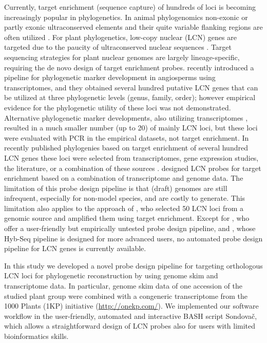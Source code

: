 \documentclass[a4paper, 11pt, twoside]{article}
\begin{document}
Currently, target enrichment (sequence capture) of hundreds of loci is becoming increasingly popular in phylogenetics. In animal phylogenomics non-exonic or partly exonic ultraconserved elements and their quite variable flanking regions are often utilized \citep[e.g.][]{Faircloth2012, Hedtke2013, Smith2014}. For plant phylogenetics, low-copy nuclear (LCN) genes are targeted \citep{Mandel2014, Weitemier2014, Grover2015, Heyduk2015, Mandel2015, Nicholls2015, Stephens2015a, Stephens2015} due to the paucity of ultraconserved nuclear sequences \citep{Reneker2012}. Target sequencing strategies for plant nuclear genomes are largely lineage-specific, requiring the de novo design of target enrichment probes. \citet{Chamala2015a} recently introduced a pipeline for phylogenetic marker development in angiosperms using transcriptomes, and they obtained several hundred putative LCN genes that can be utilized at three phylogenetic levels (genus, family, order); however empirical evidence for the phylogenetic utility of these loci was not demonstrated. Alternative phylogenetic marker developments, also utilizing transcriptomes \citep{Pillon2014, Rothfels2013, Tonnabel2014}, resulted in a much smaller number (up to 20) of mainly LCN loci, but these loci were evaluated with PCR in the empirical datasets, not target enrichment. In recently published phylogenies based on target enrichment of several hundred LCN genes these loci were selected from transcriptomes, gene expression studies, the literature, or a combination of these sources \citep{Mandel2014, Grover2015, Heyduk2015, Mandel2015, Nicholls2015, Stephens2015a, Stephens2015}. \citet{Weitemier2014} designed LCN probes for target enrichment based on a combination of transcriptome and genome data. The limitation of this probe design pipeline is that (draft) genomes are still infrequent, especially for non-model species, and are costly to generate. This limitation also applies to the approach of \citet{DeSousa2014}, who selected 50 LCN loci from a genomic source and amplified them using target enrichment. Except for \citet{Chamala2015a}, who offer a user-friendly but empirically untested probe design pipeline, and \citet{Weitemier2014}, whose Hyb-Seq pipeline is designed for more advanced users, no automated probe design pipeline for LCN genes is currently available.

In this study \citep{Schmickl2016} we developed a novel probe design pipeline for targeting orthologous LCN loci for phylogenetic reconstruction by using genome skim and transcriptome data. In particular, genome skim data of one accession of the studied plant group were combined with a congeneric transcriptome from the 1000 Plants (1KP) initiative (\href{http://onekp.com/}{http://onekp.com/}). We implemented our software workflow in the user-friendly, automated and interactive BASH script Sondovač, which allows a straightforward design of LCN probes also for users with limited bioinformatics skills.
\end{document}
